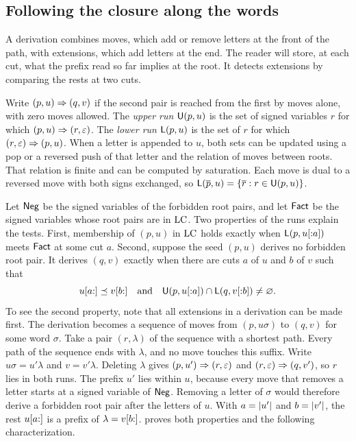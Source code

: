 \subsection{Following the closure along the words}
\label{sec:reader-closure}

A derivation combines moves, which add or remove letters at the front of
the path, with extensions, which add letters at the end. The reader will
store, at each cut, what the prefix read so far implies at the root. It
detects extensions by comparing the rests at two cuts.

Write $(p,u)\Rightarrow(q,v)$ if the second pair is reached from the first by
moves alone, with zero moves allowed. The \emph{upper run} $\mathsf U(p,u)$ is
the set of signed variables $r$ for which $(p,u)\Rightarrow(r,\varepsilon)$.
The \emph{lower run} $\mathsf L(p,u)$ is the set of $r$ for which
$(r,\varepsilon)\Rightarrow(p,u)$. When a letter is appended to $u$, both sets
can be updated using a pop or a reversed push of that letter and the
relation of moves between roots. That relation is finite and can be
computed by saturation. Each move is dual to a reversed move with both
signs exchanged, so $\mathsf L(\overline{p},u)=\{\overline{r}:r\in\mathsf U(p,u)\}$.

Let $\mathsf{Neg}$ be the signed variables of the forbidden root pairs, and let
$\mathsf{Fact}$ be the signed variables whose root pairs are in $\mathrm{LC}$. Two
properties of the runs explain the tests. First, membership of $(p,u)$ in
$\mathrm{LC}$ holds exactly when $\mathsf L(p,u[{:}a])$ meets $\mathsf{Fact}$ at some cut $a$.
Second, suppose the seed $(p,u)$ derives no forbidden root pair.
It derives $(q,v)$ exactly when there are cuts $a$ of $u$ and $b$ of $v$
such that
\begin{equation}
  u[a{:}]\preceq v[b{:}]
  \quad\text{and}\quad
  \mathsf U(p,u[{:}a])\cap\mathsf L(q,v[{:}b])\ne\varnothing .
  \label{eq:cut-derivation}
\end{equation}
To see the second property, note that all extensions in a derivation can
be made first. The derivation becomes a sequence of moves from $(p,u\sigma)$
to $(q,v)$ for some word $\sigma$. Take a pair $(r,\lambda)$ of the sequence
with a shortest path. Every path of the sequence ends with $\lambda$, and
no move touches this suffix. Write $u\sigma=u'\lambda$ and $v=v'\lambda$.
Deleting $\lambda$ gives $(p,u')\Rightarrow(r,\varepsilon)$ and $(r,\varepsilon)\Rightarrow(q,v')$, so
$r$ lies in both runs. The prefix $u'$ lies within $u$, because every move
that removes a letter starts at a signed variable of $\mathsf{Neg}$. Removing a
letter of $\sigma$ would therefore derive a forbidden root pair after the
letters of $u$. With $a=\lvert u'\rvert$ and $b=\lvert v'\rvert$, the rest $u[a{:}]$ is a
prefix of $\lambda=v[b{:}]$.
 proves both properties and the following
characterization.

